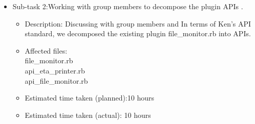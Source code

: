 \documentclass{article}
\begin{document}
\begin{itemize}
                    \begin{itemize}
			 \item  Sub-task 2:Working with group members to decompose the plugin APIs .
                         \begin{itemize}
					\item Description: Discussing with group members and In terms of Ken's   API standard, we decomposed the existing plugin 
                                        file\_monitor.rb into APIs.
                                        \item Affected files: \\
                                             file\_monitor.rb\\
                                             api\_eta\_printer.rb\\
                                             api\_file\_monitor.rb\\
					\item Estimated time taken (planned):10 hours
					\item Estimated time taken (actual): 10 hours
		       \end{itemize}              
                       \end{itemize}     
           \end{itemize}
\end{document}
